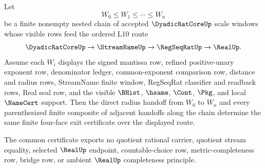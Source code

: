 \begin{theorem}
\label{thm:dyadicratcore-four-face-scale-window-chain-induction}
Let
$$
W_0 \leq W_1 \leq \cdots \leq W_n
$$
be a finite nonempty nested chain of accepted $\DyadicRatCoreUp$ scale windows whose visible rows feed the ordered L10 route
$$
\DyadicRatCoreUp \to \StreamNameUp \to \RegSeqRatUp \to \RealUp .
$$
Assume each $W_i$ displays the signed mantissa row, refined positive-unary exponent row, denominator ledger, common-exponent comparison row, distance and radius rows, StreamName finite window, RegSeqRat classifier and readback rows, Real seal row, and the visible $\BHist$, $\hsame$, $\Cont$, $\Pkg$, and local $\NameCert$ support. Then the direct radius handoff from $W_0$ to $W_n$ and every parenthesized finite composite of adjacent handoffs along the chain determine the same finite four-face exit certificate over the displayed route.

The common certificate exports no quotient rational carrier, quotient stream equality, selected $\RealUp$ endpoint, countable-choice row, metric-completeness row, bridge row, or ambient $\RealUp$ completeness principle.
\end{theorem}
